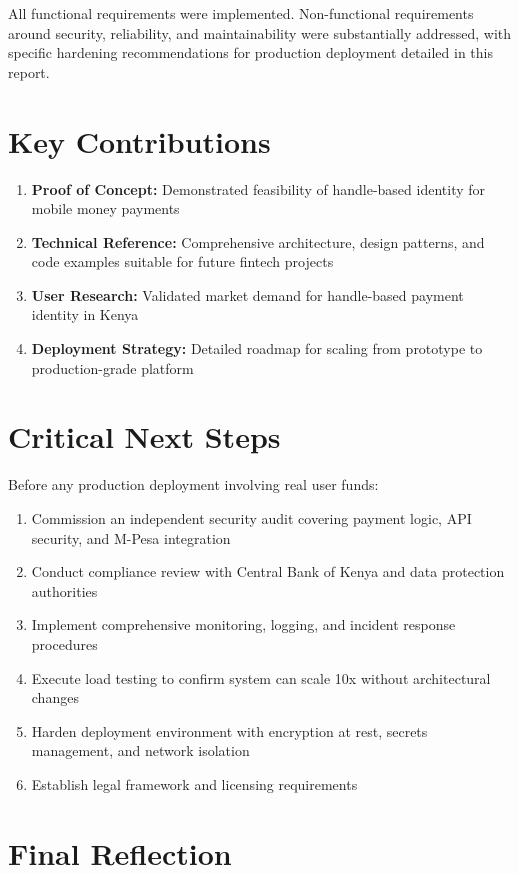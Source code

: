 \documentclass[12pt, a4paper, twoside, openright]{report}
\begin{document}
All functional requirements were implemented. Non-functional requirements around security, reliability, and maintainability were substantially addressed, with specific hardening recommendations for production deployment detailed in this report.

\section{Key Contributions}

\begin{enumerate}
    \item \textbf{Proof of Concept:} Demonstrated feasibility of handle-based identity for mobile money payments
    \item \textbf{Technical Reference:} Comprehensive architecture, design patterns, and code examples suitable for future fintech projects
    \item \textbf{User Research:} Validated market demand for handle-based payment identity in Kenya
    \item \textbf{Deployment Strategy:} Detailed roadmap for scaling from prototype to production-grade platform
\end{enumerate}

\section{Critical Next Steps}

Before any production deployment involving real user funds:

\begin{enumerate}
    \item Commission an independent security audit covering payment logic, API security, and M-Pesa integration
    \item Conduct compliance review with Central Bank of Kenya and data protection authorities
    \item Implement comprehensive monitoring, logging, and incident response procedures
    \item Execute load testing to confirm system can scale 10x without architectural changes
    \item Harden deployment environment with encryption at rest, secrets management, and network isolation
    \item Establish legal framework and licensing requirements
\end{enumerate}

\section{Final Reflection}
\end{document}
